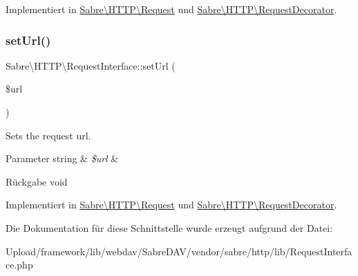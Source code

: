 Implementiert in \mbox{\hyperlink{class_sabre_1_1_h_t_t_p_1_1_request_aa14eebf681c465e6077432d06e14b404}{Sabre\textbackslash{}\+H\+T\+T\+P\textbackslash{}\+Request}} und \mbox{\hyperlink{class_sabre_1_1_h_t_t_p_1_1_request_decorator_acaa7bf6e2566bd2c554dc8f589c93f51}{Sabre\textbackslash{}\+H\+T\+T\+P\textbackslash{}\+Request\+Decorator}}.

\mbox{\label{interface_sabre_1_1_h_t_t_p_1_1_request_interface_aa588eaadc450324b11562119bb1933a0}} 
\subsubsection{\texorpdfstring{set\+Url()}{setUrl()}}
{\footnotesize\ttfamily Sabre\textbackslash{}\+H\+T\+T\+P\textbackslash{}\+Request\+Interface\+::set\+Url (\begin{DoxyParamCaption}\item[{}]{\$url }\end{DoxyParamCaption})}

Sets the request url.


\begin{DoxyParams}[1]{Parameter}
string & {\em \$url} & \\
\hline
\end{DoxyParams}
\begin{DoxyReturn}{Rückgabe}
void 
\end{DoxyReturn}


Implementiert in \mbox{\hyperlink{class_sabre_1_1_h_t_t_p_1_1_request_abdd576a7f208efa8438967bac9422093}{Sabre\textbackslash{}\+H\+T\+T\+P\textbackslash{}\+Request}} und \mbox{\hyperlink{class_sabre_1_1_h_t_t_p_1_1_request_decorator_a7cb8a935719f2e497d30a8aabdef58b2}{Sabre\textbackslash{}\+H\+T\+T\+P\textbackslash{}\+Request\+Decorator}}.



Die Dokumentation für diese Schnittstelle wurde erzeugt aufgrund der Datei\+:\begin{DoxyCompactItemize}
\item 
Upload/framework/lib/webdav/\+Sabre\+D\+A\+V/vendor/sabre/http/lib/Request\+Interface.\+php\end{DoxyCompactItemize}
